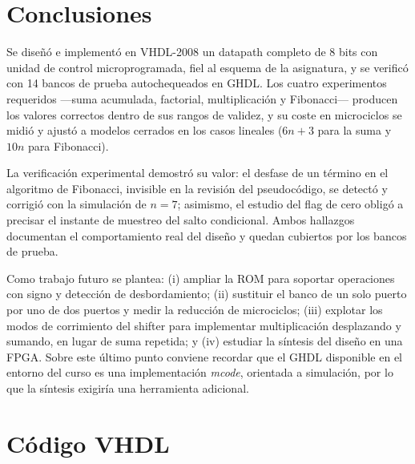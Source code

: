 \documentclass[llncs]{llncs}
\begin{document}
\section{Conclusiones}
\label{sec:conclusiones}

Se diseñó e implementó en VHDL-2008 un datapath completo de 8 bits con
unidad de control microprogramada, fiel al esquema de la asignatura, y
se verificó con 14 bancos de prueba autochequeados en GHDL. Los cuatro
experimentos requeridos ---suma acumulada, factorial, multiplicación y
Fibonacci--- producen los valores correctos dentro de sus rangos de
validez, y su coste en microciclos se midió y ajustó a modelos
cerrados en los casos lineales ($6n+3$ para la suma y $10n$ para
Fibonacci).

La verificación experimental demostró su valor: el desfase de un término
en el algoritmo de Fibonacci, invisible en la revisión del pseudocódigo,
se detectó y corrigió con la simulación de $n=7$; asimismo, el estudio
del flag de cero obligó a precisar el instante de muestreo del salto
condicional. Ambos hallazgos documentan el comportamiento real del
diseño y quedan cubiertos por los bancos de prueba.

Como trabajo futuro se plantea: (i) ampliar la ROM para soportar
operaciones con signo y detección de desbordamiento; (ii) sustituir el
banco de un solo puerto por uno de dos puertos y medir la reducción de
microciclos; (iii) explotar los modos de corrimiento del shifter para
implementar multiplicación desplazando y sumando, en lugar de suma
repetida; y (iv) estudiar la síntesis del diseño en una FPGA. Sobre este
último punto conviene recordar que el GHDL disponible en el entorno del
curso es una implementación \emph{mcode}, orientada a simulación, por lo
que la síntesis exigiría una herramienta adicional.




\appendix
\section{Código VHDL}
\label{app:codigo}
\end{document}
